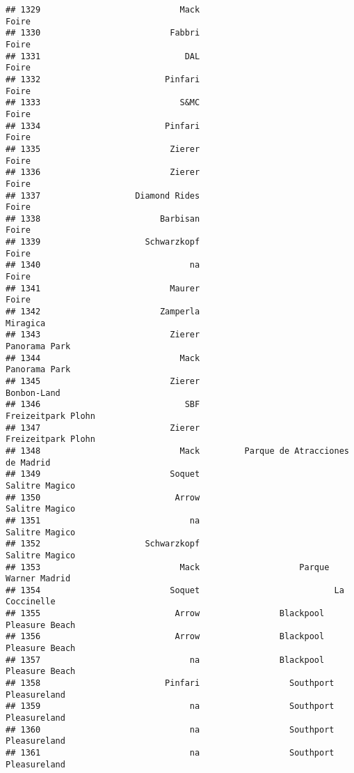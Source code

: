 \documentclass[
]{article}
\begin{document}
\begin{verbatim}
## 1329                            Mack                                   Foire
## 1330                          Fabbri                                   Foire
## 1331                             DAL                                   Foire
## 1332                         Pinfari                                   Foire
## 1333                            S&MC                                   Foire
## 1334                         Pinfari                                   Foire
## 1335                          Zierer                                   Foire
## 1336                          Zierer                                   Foire
## 1337                   Diamond Rides                                   Foire
## 1338                        Barbisan                                   Foire
## 1339                     Schwarzkopf                                   Foire
## 1340                              na                                   Foire
## 1341                          Maurer                                   Foire
## 1342                        Zamperla                                Miragica
## 1343                          Zierer                           Panorama Park
## 1344                            Mack                           Panorama Park
## 1345                          Zierer                             Bonbon-Land
## 1346                             SBF                      Freizeitpark Plohn
## 1347                          Zierer                      Freizeitpark Plohn
## 1348                            Mack         Parque de Atracciones de Madrid
## 1349                          Soquet                          Salitre Magico
## 1350                           Arrow                          Salitre Magico
## 1351                              na                          Salitre Magico
## 1352                     Schwarzkopf                          Salitre Magico
## 1353                            Mack                    Parque Warner Madrid
## 1354                          Soquet                           La Coccinelle
## 1355                           Arrow                Blackpool Pleasure Beach
## 1356                           Arrow                Blackpool Pleasure Beach
## 1357                              na                Blackpool Pleasure Beach
## 1358                         Pinfari                  Southport Pleasureland
## 1359                              na                  Southport Pleasureland
## 1360                              na                  Southport Pleasureland
## 1361                              na                  Southport Pleasureland

\end{verbatim}
\end{document}
